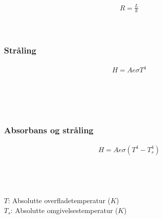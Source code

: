 	\begin{align}
		R=\frac{L}{k}
	\end{align}
	\termmod\\
	\lengde\\
	\termkond

	\subsubsection{Stråling}
		\begin{align}
			H=Ae\sigma T^4
		\end{align}
		\varmehast\\
		\areal\\
		\emis\\
		\stefboltzkonst\\
		\tempk

	\subsubsection{Absorbans og stråling}
		\begin{align}
			H=Ae\sigma(T^4-T_s^4)
		\end{align}
		\varmehast\\
		\areal\\
		\emis\\
		\stefboltzkonst\\
		$T$: Absolutte overfladetemperatur ($K$)\\
		$T_s$: Absolutte omgivelsestemperatur ($K$)